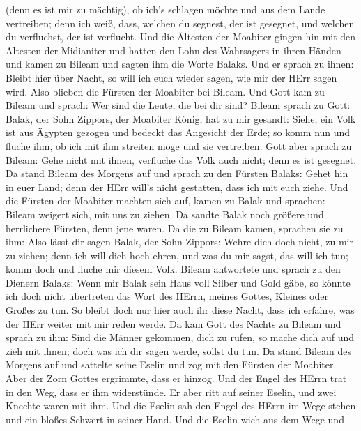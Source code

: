 (denn es ist mir zu mächtig), ob ich's schlagen möchte und aus dem Lande
vertreiben; denn ich weiß, dass, welchen du segnest, der ist gesegnet,
und welchen du verfluchst, der ist verflucht.  Und die
Ältesten der Moabiter gingen hin mit den Ältesten der Midianiter und
hatten den Lohn des Wahrsagers in ihren Händen und kamen zu Bileam und
sagten ihm die Worte Balaks.  Und er sprach zu ihnen: Bleibt
hier über Nacht, so will ich euch wieder sagen, wie mir der HErr sagen
wird. Also blieben die Fürsten der Moabiter bei Bileam.  Und
Gott kam zu Bileam und sprach: Wer sind die Leute, die bei dir sind?
 Bileam sprach zu Gott: Balak, der Sohn Zippors, der
Moabiter König, hat zu mir gesandt:  Siehe, ein Volk ist
aus Ägypten gezogen und bedeckt das Angesicht der Erde; so komm nun und
fluche ihm, ob ich mit ihm streiten möge und sie vertreiben.
 Gott aber sprach zu Bileam: Gehe nicht mit ihnen,
verfluche das Volk auch nicht; denn es ist gesegnet.  Da
stand Bileam des Morgens auf und sprach zu den Fürsten Balaks: Gehet hin
in euer Land; denn der HErr will's nicht gestatten, dass ich mit euch
ziehe.  Und die Fürsten der Moabiter machten sich auf,
kamen zu Balak und sprachen: Bileam weigert sich, mit uns zu ziehen.
 Da sandte Balak noch größere und herrlichere Fürsten, denn
jene waren.  Da die zu Bileam kamen, sprachen sie zu ihm:
Also lässt dir sagen Balak, der Sohn Zippors: Wehre dich doch nicht, zu
mir zu ziehen;  denn ich will dich hoch ehren, und was du
mir sagst, das will ich tun; komm doch und fluche mir diesem Volk.
 Bileam antwortete und sprach zu den Dienern Balaks: Wenn
mir Balak sein Haus voll Silber und Gold gäbe, so könnte ich doch nicht
übertreten das Wort des HErrn, meines Gottes, Kleines oder Großes zu
tun.  So bleibt doch nur hier auch ihr diese Nacht, dass
ich erfahre, was der HErr weiter mit mir reden werde.  Da
kam Gott des Nachts zu Bileam und sprach zu ihm: Sind die Männer
gekommen, dich zu rufen, so mache dich auf und zieh mit ihnen; doch was
ich dir sagen werde, sollst du tun.  Da stand Bileam des
Morgens auf und sattelte seine Eselin und zog mit den Fürsten der
Moabiter.  Aber der Zorn Gottes ergrimmte, dass er hinzog.
Und der Engel des HErrn trat in den Weg, dass er ihm widerstünde. Er
aber ritt auf seiner Eselin, und zwei Knechte waren mit ihm.
 Und die Eselin sah den Engel des HErrn im Wege stehen und
ein bloßes Schwert in seiner Hand. Und die Eselin wich aus dem Wege und
